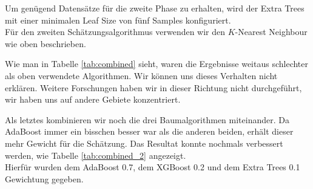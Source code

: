 Um genügend Datensätze für die zweite Phase zu erhalten, wird der Extra Trees mit einer minimalen Leaf Size von fünf Samples konfiguriert.\\
Für den zweiten Schätzungsalgorithmus verwenden wir den $K$-Nearest Neighbour wie oben beschrieben.

\begin{table}[ht]
\centering
{}
\caption{Ergebnisse eigen entwickelter Algorithmus}
\label{tab:combined}
\end{table}

Wie man in Tabelle \ref{tab:combined} sieht, waren die Ergebnisse weitaus schlechter als oben verwendete Algorithmen. Wir können uns dieses Verhalten nicht erklären. Weitere Forschungen haben wir in dieser Richtung nicht durchgeführt, wir haben uns auf andere Gebiete konzentriert.

Als letztes kombinieren wir noch die drei Baumalgorithmen miteinander. Da AdaBoost immer ein bisschen besser war als die anderen beiden, erhält dieser mehr Gewicht für die Schätzung. Das Resultat konnte nochmals verbessert werden, wie Tabelle \ref{tab:combined_2} angezeigt.\\
Hierfür wurden dem AdaBoost 0.7, dem XGBoost 0.2 und dem Extra Trees 0.1  Gewichtung gegeben.

\begin{table}[ht]
\centering
{}
\caption{Kombination von AdaBoost, XGBoost und Extra Trees}
\label{tab:combined_2}
\end{table}

